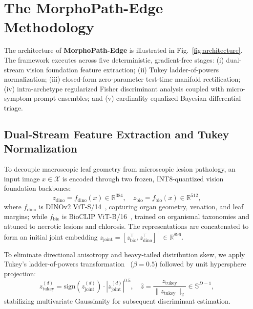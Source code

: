 \section{The MorphoPath-Edge Methodology}
\label{sec:methodology}

The architecture of \textbf{MorphoPath-Edge} is illustrated in Fig.~\ref{fig:architecture}. The framework executes across five deterministic, gradient-free stages: (i) dual-stream vision foundation feature extraction; (ii) Tukey ladder-of-powers normalization; (iii) closed-form zero-parameter test-time manifold rectification; (iv) intra-archetype regularized Fisher discriminant analysis coupled with micro-symptom prompt ensembles; and (v) cardinality-equalized Bayesian differential triage.

\subsection{Dual-Stream Feature Extraction and Tukey Normalization}
\label{subsec:dual_stream_tukey}
To decouple macroscopic leaf geometry from microscopic lesion pathology, an input image $x \in \mathcal{X}$ is encoded through two frozen, INT8-quantized vision foundation backbones:
\begin{equation}
    z_{\text{dino}} = f_{\text{dino}}(x) \in \mathbb{R}^{384}, \quad z_{\text{bio}} = f_{\text{bio}}(x) \in \mathbb{R}^{512},
    \label{eq:dual_features}
\end{equation}
where $f_{\text{dino}}$ is DINOv2 ViT-S/14~\cite{oquab2023dinov2}, capturing organ geometry, venation, and leaf margins; while $f_{\text{bio}}$ is BioCLIP ViT-B/16~\cite{stevens2024bioclip}, trained on organismal taxonomies and attuned to necrotic lesions and chlorosis. The representations are concatenated to form an initial joint embedding $z_{\text{joint}} = [z_{\text{bio}}^\top, z_{\text{dino}}^\top]^\top \in \mathbb{R}^{896}$.

To eliminate directional anisotropy and heavy-tailed distribution skew, we apply Tukey's ladder-of-powers transformation~\cite{tukey1977exploratory} ($\beta=0.5$) followed by unit hypersphere projection:
\begin{equation}
    z_{\text{tukey}}^{(d)} = \text{sign}\left(z_{\text{joint}}^{(d)}\right) \cdot \left| z_{\text{joint}}^{(d)} \right|^{0.5}, \quad \hat{z} = \frac{z_{\text{tukey}}}{\| z_{\text{tukey}} \|_2} \in \mathbb{S}^{D-1},
    \label{eq:tukey_transform}
\end{equation}
stabilizing multivariate Gaussianity for subsequent discriminant estimation.

